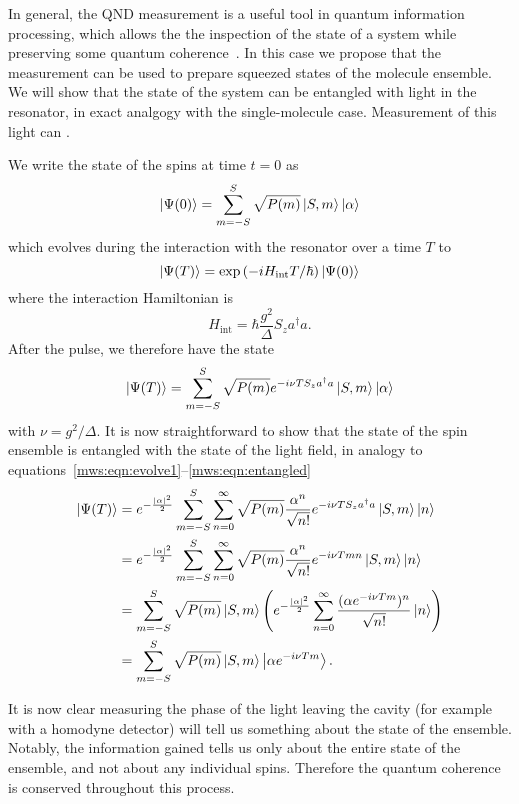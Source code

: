 In general, the QND measurement is a useful tool in quantum information
processing, which allows the the inspection of the state of a system  while
preserving some quantum coherence~\cite{}.
%
In this case we propose that the measurement can be used to prepare squeezed
states of the molecule ensemble.
%
We will show that the state of the system can be entangled with light in the
resonator, in exact analgogy with the single-molecule case. Measurement of this
light can .

We write the state of the spins at time $t=0$ as
%
\begin{equation}
  \ket{\Psi(0)} = \sum_{m=-S}^S \sqrt{P(m)} \ket{S, m}\ket{\alpha}
\end{equation}
%
which evolves during the interaction with the resonator over a time $T$ to
%
\begin{equation}
  \ket{\Psi(T)} = \exp\left(-iH_\text{int}T/\hbar\right)\ket{\Psi(0)}
\end{equation}
%
where the interaction Hamiltonian is
%
\begin{equation}
  H_\text{int} = \hbar \frac{g^2}{\Delta} S_z a^\dagger a.
\end{equation}
%
After the pulse, we therefore have the state
%
\begin{equation}
  \ket{\Psi(T)} = \sum_{m=-S}^S \sqrt{P(m)} e^{-i\nu T S_z
  a^\dagger a} \ket{S, m}\ket{\alpha}
\end{equation}
%
with $\nu = g^2/\Delta$. It is now straightforward to show that
the state of the spin ensemble is entangled with the state of the light field,
in analogy to equations~\ref{mws:eqn:evolve1}--\ref{mws:eqn:entangled}
%
\begin{align}
  \ket{\Psi(T)} &= e^{-\frac{|\alpha|^2}{2}}\sum_{m=-S}^S \sum_{n=0}^\infty \sqrt{P(m)}
   \frac{\alpha^n}{\sqrt{n!}} e^{-i\nu T S_z a^\dagger a} \ket{S, m} \ket{n}
   \\
  &= e^{-\frac{|\alpha|^2}{2}}\sum_{m=-S}^S \sum_{n=0}^\infty \sqrt{P(m)}
  \frac{\alpha^n}{\sqrt{n!}} e^{-i\nu Tm n} \ket{S, m} \ket{n} \\
  &= \sum_{m=-S}^S \sqrt{P(m)} \ket{S, m} \left( e^{-\frac{|\alpha|^2}{2}}
  \sum_{n=0}^\infty \frac{(\alpha e^{-i\nu T m})^n}{\sqrt{n!}}\ket{n}\right)
  \\
  &= \sum_{m=-S}^S \sqrt{P(m)} \ket{S, m}\ket{\alpha e^{-i\nu T m}}.
\end{align}

It is now clear measuring the phase of the light leaving the cavity
(for example with a homodyne detector) will tell us something about
the state of the ensemble. Notably, the information gained tells us only about
the entire state of the ensemble, and not about any individual spins. Therefore
the quantum coherence is conserved throughout this process.

